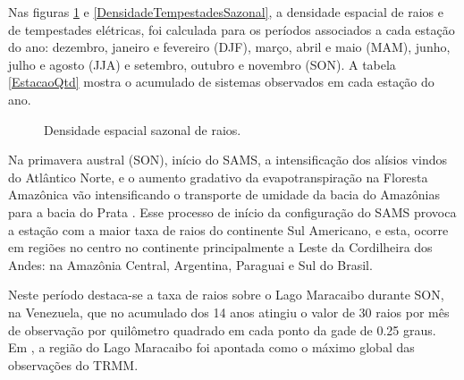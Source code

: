 Nas figuras \ref{TaxaFlash} e \ref{DensidadeTempestadesSazonal}, a densidade espacial de raios e de tempestades elétricas, foi calculada para os períodos associados a cada estação do ano: dezembro, janeiro e fevereiro (DJF), março, abril e maio (MAM), junho, julho e agosto (JJA) e setembro, outubro e novembro (SON). A tabela \ref{EstacaoQtd} mostra o acumulado de sistemas observados em cada estação do ano.


\begin{figure}[!ht]
  \caption{Densidade espacial sazonal de raios.}
\label{TaxaFlash}
\end{figure} 


Na primavera austral (SON), início do SAMS, a intensificação dos alísios vindos do Atlântico Norte, e o aumento gradativo da evapotranspiração na Floresta Amazônica vão intensificando o transporte de umidade da bacia do Amazônias para a bacia do Prata \cite{marengo2004}.  Esse processo de início da configuração do SAMS provoca a estação com a maior taxa de raios do continente Sul Americano, e esta, ocorre em regiões no centro no continente principalmente a Leste da Cordilheira dos Andes: na Amazônia Central, Argentina, Paraguai e Sul do Brasil.


Neste período destaca-se a taxa de raios sobre o Lago Maracaibo durante SON, na Venezuela, que no acumulado dos 14 anos atingiu o valor de 30 raios por mês de observação por quilômetro quadrado em cada ponto da gade de 0.25 graus. Em , a região do Lago Maracaibo foi apontada como o máximo global das observações do TRMM. 



